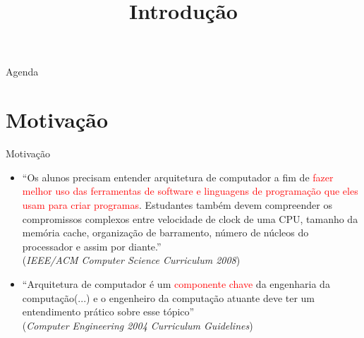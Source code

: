 



\title{\cursogrande\\ \vspace{1cm}Introdução}


   \maketitle[randomdots={false}]
   
   \begin{slide}{Agenda}
      \tableofcontents[content=sections]
   \end{slide}

\section[ slide = true]{Motivação}
\begin{slide}[toc=]{Motivação}
\begin{itemize}
	\item ``Os alunos precisam entender arquitetura de computador a fim de \textcolor{red}{fazer melhor uso das ferramentas de software e linguagens de programação que eles usam para criar programas}. Estudantes também devem compreender os compromissos complexos entre velocidade de clock de uma CPU, tamanho da memória cache, organização de barramento, número de núcleos do processador e assim por diante.''\\ {(\textit{IEEE/ACM Computer Science Curriculum 2008})}
     
  \item ``Arquitetura de computador é um \textcolor{red}{componente chave} da engenharia da computação(...) e o engenheiro da computação atuante deve ter um entendimento prático sobre esse tópico'' \\{(\textit{Computer Engineering 2004 Curriculum Guidelines})}
\end{itemize}
\end{slide}

